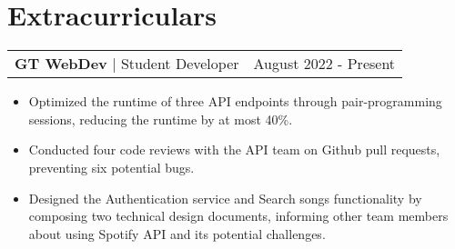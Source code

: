 \documentclass[letterpaper,11pt]{article}
\makeatletter
\newcommand{\resumeExperienceHeading}[3]{
    \begin{tabular*}{0.99\textwidth}[t]{l@{\extracolsep{\fill}}r}
      \textbf{#1} $\vert$ {#2} & {#3} \\
    \end{tabular*}\vspace{-3pt}
}
\newcommand{\resumeItemListStart}{\begin{itemize}[noitemsep]\vspace{-4pt}}
\newcommand{\resumeItemListEnd}{\end{itemize}}
\makeatother
\begin{document}
\section{Extracurriculars}
  \resumeExperienceHeading{GT WebDev}{Student Developer}{August 2022 - Present}
    \resumeItemListStart
      \item {Optimized the runtime of three API endpoints through pair-programming sessions, reducing the runtime by at most 40\%.}
      \item {Conducted four code reviews with the API team on Github pull requests, preventing six potential bugs.}
      \item {Designed the Authentication service and Search songs functionality by composing two technical design documents, informing other team members about using Spotify API and its potential challenges.}
    \resumeItemListEnd
  
\end{document}
